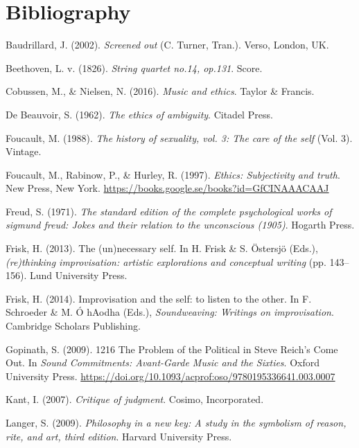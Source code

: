 \documentclass[11pt]{article}
\begin{document}
\section*{Bibliography}
\label{sec:org29c9736}
\begin{hangparas}{1.5em}{1}
\hypertarget{citeproc_bib_item_1}{Baudrillard, J. (2002). \textit{Screened out} (C. Turner, Tran.). Verso, London, UK.}

\hypertarget{citeproc_bib_item_2}{Beethoven, L. v. (1826). \textit{String quartet no.14, op.131}. Score.}

\hypertarget{citeproc_bib_item_3}{Cobussen, M., \& Nielsen, N. (2016). \textit{Music and ethics}. Taylor \& Francis.}

\hypertarget{citeproc_bib_item_4}{De Beauvoir, S. (1962). \textit{The ethics of ambiguity}. Citadel Press.}

\hypertarget{citeproc_bib_item_5}{Foucault, M. (1988). \textit{The history of sexuality, vol. 3: The care of the self} (Vol. 3). Vintage.}

\hypertarget{citeproc_bib_item_6}{Foucault, M., Rabinow, P., \& Hurley, R. (1997). \textit{Ethics: Subjectivity and truth}. New Press, New York. \url{https://books.google.se/books?id=GfCINAAACAAJ}}

\hypertarget{citeproc_bib_item_7}{Freud, S. (1971). \textit{The standard edition of the complete psychological works of sigmund freud: Jokes and their relation to the unconscious (1905)}. Hogarth Press.}

\hypertarget{citeproc_bib_item_8}{Frisk, H. (2013). The (un)necessary self. In H. Frisk \& S. Östersjö (Eds.), \textit{(re)thinking improvisation: artistic explorations and conceptual writing} (pp. 143–156). Lund University Press.}

\hypertarget{citeproc_bib_item_9}{Frisk, H. (2014). Improvisation and the self: to listen to the other. In F. Schroeder \& M. Ó hAodha (Eds.), \textit{Soundweaving: Writings on improvisation}. Cambridge Scholars Publishing.}

\hypertarget{citeproc_bib_item_10}{Gopinath, S. (2009). 1216 The Problem of the Political in Steve Reich’s Come Out. In \textit{Sound Commitments: Avant-Garde Music and the Sixties}. Oxford University Press. \url{https://doi.org/10.1093/acprof:oso/9780195336641.003.0007}}

\hypertarget{citeproc_bib_item_11}{Kant, I. (2007). \textit{Critique of judgment}. Cosimo, Incorporated.}

\hypertarget{citeproc_bib_item_12}{Langer, S. (2009). \textit{Philosophy in a new key: A study in the symbolism of reason, rite, and art, third edition}. Harvard University Press.}


\end{hangparas}
\end{document}
